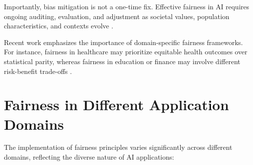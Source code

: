 \documentclass[12pt,a4paper,openright,twoside]{book}
\begin{document}
Importantly, bias mitigation is not a one-time fix. Effective fairness in AI requires ongoing auditing, evaluation, and adjustment as societal values, population characteristics, and contexts evolve \cite{suresh2021framework}.

Recent work emphasizes the importance of domain-specific fairness frameworks. For instance, fairness in healthcare may prioritize equitable health outcomes over statistical parity, whereas fairness in education or finance may involve different risk-benefit trade-offs \cite{mehrabi2021survey}.


\section{Fairness in Different Application Domains}
The implementation of fairness principles varies significantly across different domains, reflecting the diverse nature of AI applications:
\end{document}
